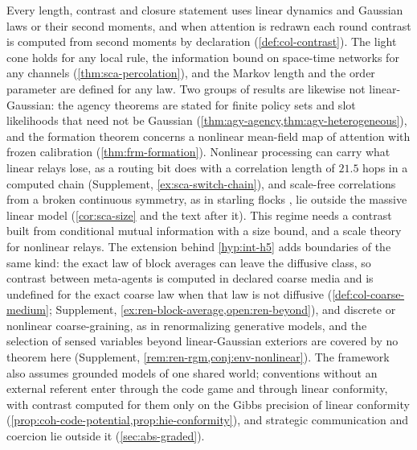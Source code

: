 Every length, contrast and closure statement uses linear dynamics and Gaussian laws or their second moments, and when attention is redrawn each round contrast is computed from second moments by declaration (\cref{def:col-contrast}). The light cone holds for any local rule, the information bound on space-time networks for any channels (\cref{thm:sca-percolation}), and the Markov length and the order parameter are defined for any law. Two groups of results are likewise not linear-Gaussian: the agency theorems are stated for finite policy sets and slot likelihoods that need not be Gaussian (\cref{thm:agy-agency,thm:agy-heterogeneous}), and the formation theorem concerns a nonlinear mean-field map of attention with frozen calibration (\cref{thm:frm-formation}). Nonlinear processing can carry what linear relays lose, as a routing bit does with a correlation length of $21.5$ hops in a computed chain (Supplement, \cref{ex:sca-switch-chain}), and scale-free correlations from a broken continuous symmetry, as in starling flocks \citep{cavagna2010scale}, lie outside the massive linear model (\cref{cor:sca-size} and the text after it). This regime needs a contrast built from conditional mutual information with a size bound, and a scale theory for nonlinear relays. The extension behind \cref{hyp:int-h5} adds boundaries of the same kind: the exact law of block averages can leave the diffusive class, so contrast between meta-agents is computed in declared coarse media and is undefined for the exact coarse law when that law is not diffusive (\cref{def:col-coarse-medium}; Supplement, \cref{ex:ren-block-average,open:ren-beyond}), and discrete or nonlinear coarse-graining, as in renormalizing generative models, and the selection of sensed variables beyond linear-Gaussian exteriors are covered by no theorem here (Supplement, \cref{rem:ren-rgm,conj:env-nonlinear}). The framework also assumes grounded models of one shared world; conventions without an external referent enter through the code game and through linear conformity, with contrast computed for them only on the Gibbs precision of linear conformity (\cref{prop:coh-code-potential,prop:hie-conformity}), and strategic communication and coercion lie outside it (\cref{sec:abs-graded}).
